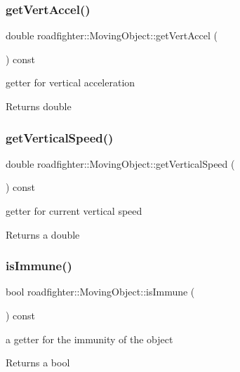 \subsubsection{\texorpdfstring{get\+Vert\+Accel()}{getVertAccel()}}
{\footnotesize\ttfamily double roadfighter\+::\+Moving\+Object\+::get\+Vert\+Accel (\begin{DoxyParamCaption}{ }\end{DoxyParamCaption}) const}

getter for vertical acceleration \begin{DoxyReturn}{Returns}
double 
\end{DoxyReturn}
\mbox{\label{classroadfighter_1_1MovingObject_a50a29cec3ac0234325691f2efd0e7fe1}} 
\subsubsection{\texorpdfstring{get\+Vertical\+Speed()}{getVerticalSpeed()}}
{\footnotesize\ttfamily double roadfighter\+::\+Moving\+Object\+::get\+Vertical\+Speed (\begin{DoxyParamCaption}{ }\end{DoxyParamCaption}) const}

getter for current vertical speed \begin{DoxyReturn}{Returns}
a double 
\end{DoxyReturn}
\mbox{\label{classroadfighter_1_1MovingObject_a25573bdb03d697a1ea65e207a9ff471a}} 
\subsubsection{\texorpdfstring{is\+Immune()}{isImmune()}}
{\footnotesize\ttfamily bool roadfighter\+::\+Moving\+Object\+::is\+Immune (\begin{DoxyParamCaption}{ }\end{DoxyParamCaption}) const}

a getter for the immunity of the object \begin{DoxyReturn}{Returns}
a bool 
\end{DoxyReturn}
\mbox{\label{classroadfighter_1_1MovingObject_a50bde99947cf9b5de95aeb58bd49ff9f}} 
